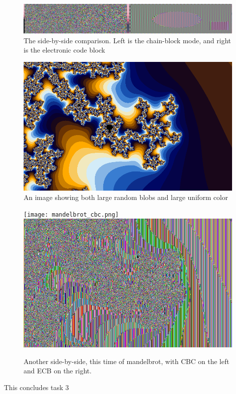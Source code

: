 \documentclass{article}
\begin{document}
\begin{figure}[!htb]
    \centering
    \includegraphics[width=\linewidth]{comparison.png}
    \caption{The side-by-side comparison. Left is the chain-block mode, and right is 
    the electronic code block}
    \label{fig:pic_original}
\end{figure}
\begin{figure}[!h]
    \centering
    \includegraphics[width=0.8\linewidth]{mandelbrot.png}
    \caption{An image showing both large random blobs and large uniform color}
    \label{fig:mandelbrot}
\end{figure}
\begin{figure}[!h]
    \centering
    \texttt{[image: mandelbrot\_cbc.png]}%
    \includegraphics[width=0.45\linewidth]{mandelbrot_ecb.png}%
    \caption{Another side-by-side, this time of mandelbrot, with CBC on the left and 
    ECB on the right.}
    \label{fig:mandelbrot_enc}
\end{figure}
This concludes task 3\\
\end{document}
